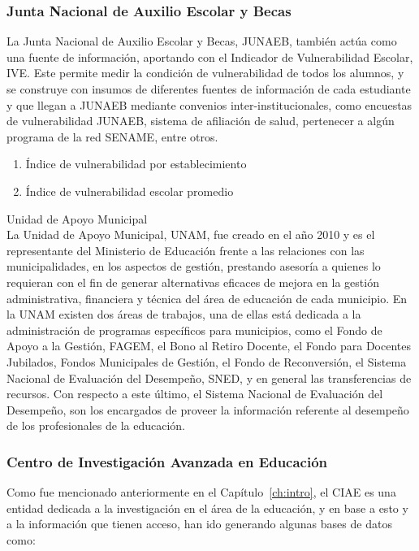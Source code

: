 \subsubsection{Junta Nacional de Auxilio Escolar y Becas}
La Junta Nacional de Auxilio Escolar y Becas, JUNAEB, también actúa como una fuente de información, aportando con el Indicador de Vulnerabilidad Escolar, IVE. Este permite medir la condición de vulnerabilidad de todos los alumnos, y se construye con insumos de diferentes fuentes de información de cada estudiante y que llegan a JUNAEB mediante convenios inter-institucionales, como encuestas de vulnerabilidad JUNAEB, sistema de afiliación de salud, pertenecer a algún programa de la red SENAME, entre otros. 

\begin{enumerate}
\item Índice de vulnerabilidad por establecimiento
\item Índice de vulnerabilidad escolar promedio
\end{enumerate}

\begin{longdescription}
\item [Unidad de Apoyo Municipal] \hfill \\
La Unidad de Apoyo Municipal, UNAM, fue creado en el año 2010 y es el representante del Ministerio de Educación frente a las relaciones con las municipalidades, en los aspectos de gestión, prestando asesoría a quienes lo requieran con el fin de generar alternativas eficaces de mejora en la gestión administrativa, financiera y técnica del área de educación de cada municipio.
En la UNAM existen dos áreas de trabajos, una de ellas está dedicada a la administración de programas específicos para municipios, como el Fondo de Apoyo a la Gestión, FAGEM, el Bono al Retiro Docente, el Fondo para Docentes Jubilados, Fondos Municipales de Gestión, el Fondo de Reconversión, el Sistema Nacional de Evaluación del Desempeño, SNED, y en general las transferencias de recursos.  
Con respecto a este último, el Sistema Nacional de Evaluación del Desempeño, son los encargados de proveer la información referente al desempeño de los profesionales de la educación. 
\end{longdescription}

\subsubsection{Centro de Investigación Avanzada en Educación}
Como fue mencionado anteriormente en el Capítulo~\ref{ch:intro}, el CIAE es una entidad dedicada a la investigación en el área de la educación, y en base a esto y a la información que tienen acceso, han ido generando algunas bases de datos como:

